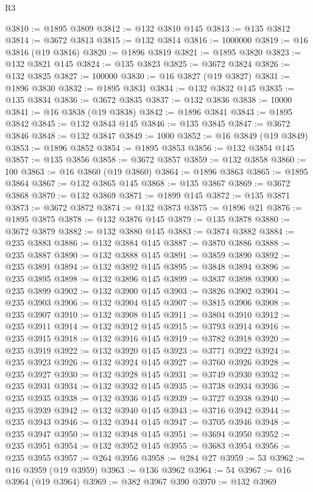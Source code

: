\begin{lexlean}{R3}
\begin{coremodule}
@3810 := @1895 @3809
@3812 := @132 @3810 @145
@3813 := @135 @3812
@3814 := @3672 @3813
@3815 := @132 @3814
@3816 := 1000000
@3819 := @16 @3816 (@19 @3816)
@3820 := @1896 @3819
@3821 := @1895 @3820
@3823 := @132 @3821 @145
@3824 := @135 @3823
@3825 := @3672 @3824
@3826 := @132 @3825
@3827 := 100000
@3830 := @16 @3827 (@19 @3827)
@3831 := @1896 @3830
@3832 := @1895 @3831
@3834 := @132 @3832 @145
@3835 := @135 @3834
@3836 := @3672 @3835
@3837 := @132 @3836
@3838 := 10000
@3841 := @16 @3838 (@19 @3838)
@3842 := @1896 @3841
@3843 := @1895 @3842
@3845 := @132 @3843 @145
@3846 := @135 @3845
@3847 := @3672 @3846
@3848 := @132 @3847
@3849 := 1000
@3852 := @16 @3849 (@19 @3849)
@3853 := @1896 @3852
@3854 := @1895 @3853
@3856 := @132 @3854 @145
@3857 := @135 @3856
@3858 := @3672 @3857
@3859 := @132 @3858
@3860 := 100
@3863 := @16 @3860 (@19 @3860)
@3864 := @1896 @3863
@3865 := @1895 @3864
@3867 := @132 @3865 @145
@3868 := @135 @3867
@3869 := @3672 @3868
@3870 := @132 @3869
@3871 := @1899 @145
@3872 := @135 @3871
@3873 := @3672 @3872
@3874 := @132 @3873
@3875 := @1896 @21
@3876 := @1895 @3875
@3878 := @132 @3876 @145
@3879 := @135 @3878
@3880 := @3672 @3879
@3882 := @132 @3880 @145
@3883 := @3874 @3882
@3884 := @235 @3883
@3886 := @132 @3884 @145
@3887 := @3870 @3886
@3888 := @235 @3887
@3890 := @132 @3888 @145
@3891 := @3859 @3890
@3892 := @235 @3891
@3894 := @132 @3892 @145
@3895 := @3848 @3894
@3896 := @235 @3895
@3898 := @132 @3896 @145
@3899 := @3837 @3898
@3900 := @235 @3899
@3902 := @132 @3900 @145
@3903 := @3826 @3902
@3904 := @235 @3903
@3906 := @132 @3904 @145
@3907 := @3815 @3906
@3908 := @235 @3907
@3910 := @132 @3908 @145
@3911 := @3804 @3910
@3912 := @235 @3911
@3914 := @132 @3912 @145
@3915 := @3793 @3914
@3916 := @235 @3915
@3918 := @132 @3916 @145
@3919 := @3782 @3918
@3920 := @235 @3919
@3922 := @132 @3920 @145
@3923 := @3771 @3922
@3924 := @235 @3923
@3926 := @132 @3924 @145
@3927 := @3760 @3926
@3928 := @235 @3927
@3930 := @132 @3928 @145
@3931 := @3749 @3930
@3932 := @235 @3931
@3934 := @132 @3932 @145
@3935 := @3738 @3934
@3936 := @235 @3935
@3938 := @132 @3936 @145
@3939 := @3727 @3938
@3940 := @235 @3939
@3942 := @132 @3940 @145
@3943 := @3716 @3942
@3944 := @235 @3943
@3946 := @132 @3944 @145
@3947 := @3705 @3946
@3948 := @235 @3947
@3950 := @132 @3948 @145
@3951 := @3694 @3950
@3952 := @235 @3951
@3954 := @132 @3952 @145
@3955 := @3683 @3954
@3956 := @235 @3955
@3957 := @264 @3956
@3958 := @284 @27
@3959 := 53
@3962 := @16 @3959 (@19 @3959)
@3963 := @136 @3962
@3964 := 54
@3967 := @16 @3964 (@19 @3964)
@3969 := @382 @3967 @390
@3970 := @132 @3969

\end{coremodule}
\end{lexlean}
